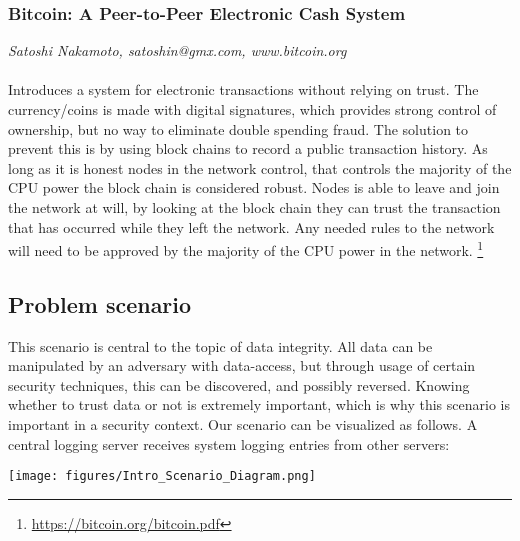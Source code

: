 \subsubsection{Bitcoin: A Peer-to-Peer Electronic Cash System}
\footnotesize \textit{Satoshi Nakamoto, satoshin@gmx.com, www.bitcoin.org}
\\\\
\normalsize
Introduces a system for electronic transactions without relying on trust. The currency/coins is made with digital signatures, which provides strong control of ownership, but no way to eliminate double spending fraud. The solution to prevent this is by using block chains to record a public transaction history. As long as it is honest nodes in the network control, that controls the majority of the CPU power the block chain is considered robust. Nodes is able to leave and join the network at will, by looking at the block chain they can trust the transaction that has occurred while they left the network. Any needed rules to the network will need to be approved by the majority of the CPU power in the network.  \footnote{\url{https://bitcoin.org/bitcoin.pdf}}
\newpage

\subsection{Problem scenario}

This scenario is central to the topic of data integrity. All data can be manipulated by an adversary with data-access, but through usage of certain security techniques, this can be discovered, and possibly reversed. Knowing whether to trust data or not is extremely important, which is why this scenario is important in a security context.
Our scenario can be visualized as follows. A central logging server receives system logging entries from other servers:
\\

\begin{center}
    \texttt{[image: figures/Intro\_Scenario\_Diagram.png]}
\end{center}

